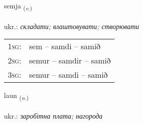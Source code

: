 \documentclass[frontgrid, backgrid]{flacards}\usepackage[]{graphicx}\usepackage[]{xcolor}
\begin{document}
\renewcommand{\flhead}{\vskip5pt \fboxsep=0pt {\small\bfseries\footnotesize Sagnorð | дієслово}}
\renewcommand{\fcfoot}{\vskip5pt \fboxsep=0pt \hspace{2pt}{\small\bfseries\footnotesize 1K}}

\renewcommand{\blhead}{\vskip5pt {\small\bfseries\footnotesize Sagnorð | дієслово }}
\renewcommand{\bcfoot}{\vskip5pt \hspace{2pt}{\small\bfseries\footnotesize 1K}}


{semja \small{\textsubscript{(\textit{v.})}} \\[1ex] %
\textphonetic{[sɛmja]} \\
ukr.: \emph{складати; влаштовувати; створювати} \\  [2ex]
\renewcommand*{\arraystretch}{0.8}
\begin{tabular}{p{1cm}l}
\textsc{1sg}: & sem -- samdi -- samið \\ 
\textsc{2sg}: & semur -- samdir -- samið \\ 
\textsc{3sg}: & semur -- samdi -- samið \\ 
\end{tabular}
}

\renewcommand{\flhead}{\vskip5pt \fboxsep=0pt {\small\bfseries\footnotesize Nafnorð | іменник}}
\renewcommand{\fcfoot}{\vskip5pt \fboxsep=0pt \hspace{2pt}{\small\bfseries\footnotesize 1K}}

\renewcommand{\blhead}{\vskip5pt {\small\bfseries\footnotesize Nafnorð | іменник }}
\renewcommand{\bcfoot}{\vskip5pt \hspace{2pt}{\small\bfseries\footnotesize 1K}}


{laun \small{\textsubscript{(\textit{n.})}} \\[1ex] %
\textphonetic{[lœiːn]} \\
ukr.: \emph{заробітна плата; нагорода} \\  [2ex]
\renewcommand*{\arraystretch}{0.8}
}
\end{document}
